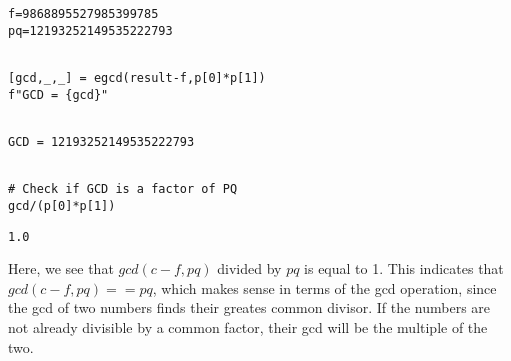 \documentclass[11pt]{article}
\begin{document}
\begin{verbatim}
f=9868895527985399785
pq=12193252149535222793
\end{verbatim}


\begin{verbatim}

[gcd,_,_] = egcd(result-f,p[0]*p[1])
f"GCD = {gcd}"


\end{verbatim}

\begin{verbatim}
GCD = 12193252149535222793
\end{verbatim}



\begin{verbatim}

# Check if GCD is a factor of PQ
gcd/(p[0]*p[1])

\end{verbatim}

\begin{verbatim}
1.0
\end{verbatim}


Here, we see that \(gcd(c-f, pq)\) divided by \(pq\) is equal to 1.
This indicates that \(gcd(c-f,pq) == pq\), which makes sense in terms of the gcd operation, since the gcd of two numbers finds their greates common divisor. If the numbers are not already divisible by a common factor, their gcd will be the multiple of the two.
\end{document}
